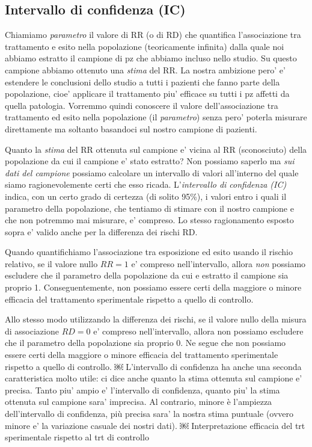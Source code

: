 \documentclass[]{book}
\begin{document}
\hypertarget{intervallo-di-confidenza-ic}{%
\subsection{Intervallo di confidenza (IC)}\label{intervallo-di-confidenza-ic}}

Chiamiamo \emph{parametro} il valore di RR (o di RD) che quantifica l'associazione tra trattamento e esito nella popolazione (teoricamente infinita) dalla quale noi abbiamo estratto il campione di pz che abbiamo incluso nello studio. Su questo campione abbiamo ottenuto una \emph{stima} del RR. La nostra ambizione pero' e' estendere le conclusioni dello studio a tutti i pazienti che fanno parte della popolazione, cioe' applicare il trattamento piu' efficace su tutti i pz affetti da quella patologia. Vorremmo quindi conoscere il valore dell'associazione tra trattamento ed esito nella popolazione (il \emph{parametro}) senza pero' poterla misurare direttamente ma soltanto basandoci sul nostro campione di pazienti.

Quanto la \emph{stima} del RR ottenuta sul campione e' vicina al RR (sconosciuto) della popolazione da cui il campione e' stato estratto? Non possiamo saperlo ma \emph{sui dati del campione} possiamo calcolare un intervallo di valori all'interno del quale siamo ragionevolemente certi che esso ricada. L'\emph{intervallo di confidenza (IC)} indica, con un certo grado di certezza (di solito 95\%), i valori entro i quali il parametro della popolazione, che tentiamo di stimare con il nostro campione e che non potremmo mai misurare, e' compreso. Lo stesso ragionamento esposto sopra e' valido anche per la differenza dei rischi RD.

Quando quantifichiamo l'associazione tra esposizione ed esito usando il rischio relativo, se il valore nullo \(RR=1\) e' compreso nell'intervallo, allora \emph{non} possiamo escludere che il parametro della popolazione da cui e
estratto il campione sia proprio 1. Conseguentemente, non possiamo essere certi della maggiore o minore efficacia del trattamento sperimentale rispetto a quello di controllo.

Allo stesso modo utilizzando la differenza dei rischi, se il valore nullo della misura di associazione \(RD = 0\) e' compreso nell'intervallo, allora non possiamo escludere che il parametro della popolazione sia proprio 0. Ne segue che non possiamo essere certi della maggiore o minore efficacia del trattamento sperimentale rispetto a quello di controllo.
￼
L'intervallo di confidenza ha anche una seconda caratteristica molto utile: ci dice anche quanto la stima ottenuta sul campione e' precisa. Tanto piu' ampio e' l'intervallo di confidenza, quanto piu' la stima ottenuta sul campione sara' imprecisa. Al contrario, minore è l'ampiezza dell'intervallo di confidenza, più precisa sara' la nostra stima puntuale (ovvero minore e' la variazione casuale dei nostri dati).
￼
Interpretazione efficacia del trt sperimentale rispetto al trt di controllo
\end{document}

